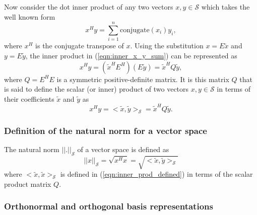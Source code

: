 Now consider the dot inner product of any two vectors $x,y\in\mathcal{S}$
which takes the well known form
%
\begin{equation}
x^H y = \sum_{i=1}^n \mbox{conjugate}(x_i) y_i,
\label{eqn:inner_x_y_sum}
\end{equation}
%
where $x^H$ is the conjugate transpose of $x$.  Using the substitution $x = E
{}\tilde{x}$ and $y = E {}\tilde{y}$, the inner product in
(\ref{eqn:inner_x_y_sum}) can be represented as
%
\begin{equation}
x^H y = ( \tilde{x}^H E^H ) ( E \tilde{y} ) = \tilde{x}^H Q \tilde{y},
\label{eqn:inner_x_y_E_prod}
\end{equation}
%
where $Q = E^H E$ is a symmetric positive-definite matrix.  It is this matrix
$Q$ that is said to define the scalar (or inner) product of two vectors
$x,y\in\mathcal{S}$ in terms of their coefficients $\tilde{x}$ and $\tilde{y}$
as
%
\begin{equation}
x^H y = <\tilde{x},\tilde{y}>_{\mathcal{S}} = \tilde{x}^H Q \tilde{y}.
\label{eqn:inner_prod_defined}
\end{equation}
%

\subsubsection{Definition of the natural norm for a vector space}

The natural norm $||.||_{\mathcal{S}}$ of a vector space is defined as
%
\begin{equation}
||x||_{\mathcal{S}} = \sqrt{x^H x} = \sqrt{<\tilde{x},\tilde{y}>_{\mathcal{S}}}
\label{eqn:natural_norm_defined}
\end{equation}
%
where $<\tilde{x},\tilde{x}>_{\mathcal{S}}$ is defined in
(\ref{eqn:inner_prod_defined}) in terms of the scalar product matrix $Q$.

\subsubsection{Orthonormal and orthogonal basis representations}

